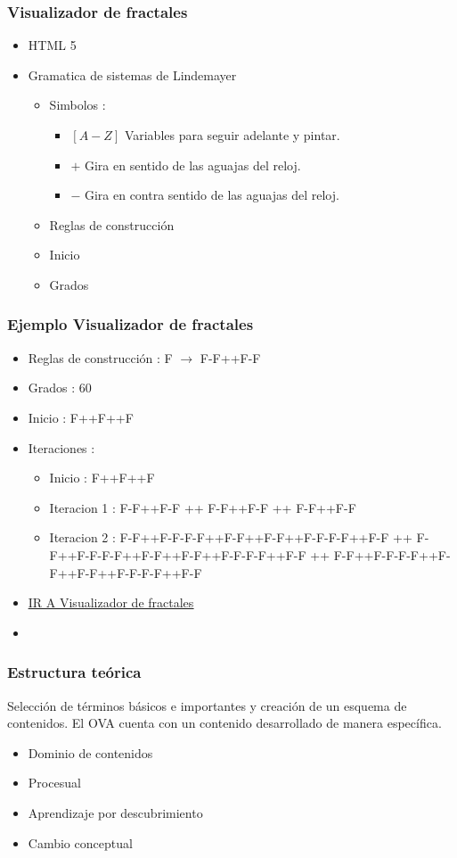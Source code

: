 \documentclass{beamer}
\begin{document}
\begin{frame}
\frametitle{Visualizador de fractales}
  \begin{itemize}
   \item HTML 5 
   \item Gramatica de sistemas de Lindemayer
   \begin{itemize}
    \item Simbolos :
      \begin{itemize}
      \item $[A-Z]$ Variables para seguir adelante y pintar.
      \item $+$ Gira en sentido de las aguajas del reloj.
      \item $-$ Gira en contra sentido de las aguajas del reloj.
      \end{itemize}
    \item Reglas de construcción
    \item Inicio
    \item Grados
   \end{itemize}  
  \end{itemize}
\end{frame}

\begin{frame}
\frametitle{Ejemplo Visualizador de fractales}
  \begin{itemize}
    \item Reglas de construcción : F $\rightarrow$ F-F++F-F
    \item Grados : 60 
    \item Inicio : F++F++F
    \item Iteraciones :
      \begin{itemize}
	\item Inicio : F++F++F
	\item Iteracion 1 : F-F++F-F ++ F-F++F-F ++ F-F++F-F
	\item Iteracion 2 : F-F++F-F-F-F++F-F++F-F++F-F-F-F++F-F ++ F-F++F-F-F-F++F-F++F-F++F-F-F-F++F-F ++ F-F++F-F-F-F++F-F++F-F++F-F-F-F++F-F
      \end{itemize}
  \item \underline{\href{http://127.0.0.1/index.php?q=node/67}{IR A Visualizador de fractales}}
  \item \hyperlink{OOFRACTAL}{}
  \end{itemize}  
\end{frame}

\begin{frame} [label=CAOS]
  \frametitle{Estructura teórica}
Selección de términos básicos e importantes y creación de un esquema de contenidos.
    El OVA cuenta con un contenido desarrollado de manera específica.
\begin{itemize}
  \item Dominio de contenidos
  \item Procesual
  \item Aprendizaje por descubrimiento
  \item Cambio conceptual
\end{itemize}
\hyperlink{OOCAOS}{}
\end{frame}
\end{document}

